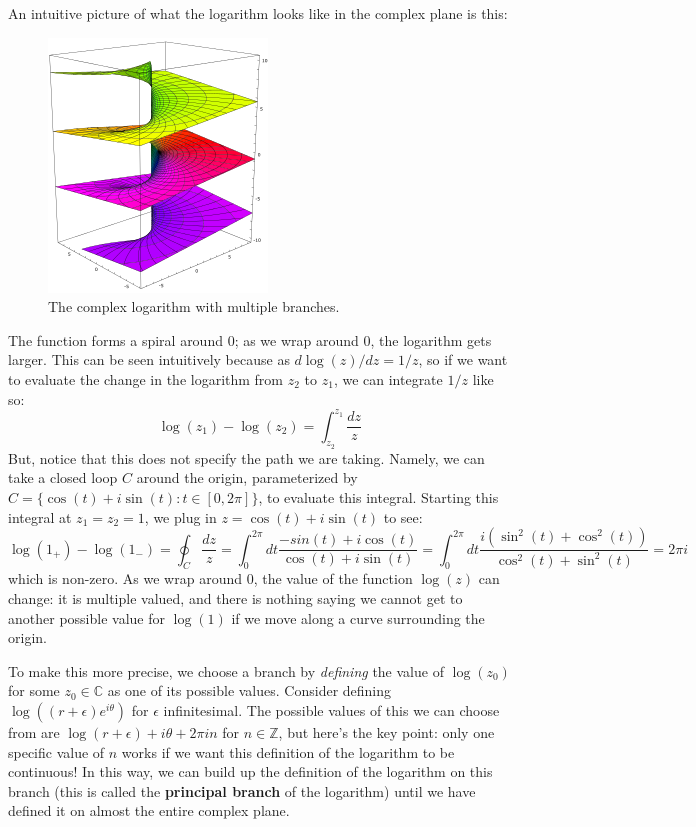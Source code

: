 \documentclass[11pt, oneside]{article}   	%
\theoremstyle{definition}
\begin{document}
An intuitive picture of what the logarithm looks like in the complex plane is this:
\begin{figure}[H]
	\centering
	\includegraphics[width = .6\textwidth]{logz}
	\caption{The complex logarithm with multiple branches.}
\end{figure}
The function forms a spiral around 0; as we wrap around 0, the logarithm gets larger. This can be seen intuitively because 
as $d\log(z)/dz = 1/z$, so if we want to evaluate the change in the logarithm from $z_2$ to $z_1$, we can integrate $1/z$ like 
so:
\begin{equation}
	\log(z_1) - \log(z_2) = \int_{z_2}^{z_1}\frac{dz}{z}
\end{equation}
But, notice that this does not specify the path we are taking. Namely, we can take a closed loop $C$ around the origin, 
parameterized by $C = \{\cos(t) + i\sin(t) : t\in [0, 2\pi]\}$, to evaluate this integral. Starting this integral at $z_1 = z_2 = 1$, we 
plug in $z = \cos(t) + i\sin(t)$ to see:
\begin{equation}
	\log(1_+) - \log(1_-) = \oint_C \frac{dz}{z} = \int_0^{2\pi}dt\frac{-sin(t) + i\cos(t)}{\cos(t) + i\sin(t)} = \int_0^{2\pi} 
	dt\frac{i(\sin^2(t) +\cos^2(t))}{\cos^2(t) + \sin^2(t)} = 2\pi i~
	\label{eq:oneoverz}
\end{equation}
which is non-zero. As we wrap around 0, the value of the function $\log(z)$ can change: it is multiple valued, and there is 
nothing saying we cannot get to another possible value for $\log(1)$ if we move along a curve surrounding the origin. 

To make this more precise, we choose a branch by \textit{defining} the value of $\log(z_0)$ for some $z_0\in\mathbb C$ as 
one of its possible values. Consider defining 
$\log((r + \epsilon) e^{i\theta})$ for $\epsilon$ infinitesimal. The possible values of this we can choose from are 
$\log(r + \epsilon) + i\theta + 2\pi i n$ for $n\in\mathbb Z$, but here's the key point: only one specific value of $n$ works if 
we want this definition of the logarithm to be continuous! In this way, we can build up the definition of the logarithm on this 
branch (this is called the \textbf{principal branch} of the logarithm) until we have defined it on almost the entire complex plane. 
\end{document}
